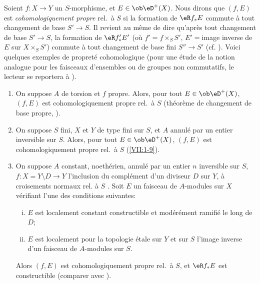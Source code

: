 Soient $f:X\to Y$ un $S$-morphisme, et $E\in\ob\eD^+(X)$. Nous dirons que 
$(f,E)$ est \emph{cohomologiquement propre} rel.\ à $S$ si la formation de 
$\eR f_\ast E$ commute à tout changement de base $S'\to S$. Il revient au 
même de dire qu'après tout changement de base $S'\to S$, la formation de 
$\eR f_\ast' E'$ (où $f'=f\times_S S'$, $E'=$image inverse de $E$ sur 
$X\times_S S'$) commute à tout changement de base fini $S'' \to S'$ (cf. 
). Voici quelques exemples de propreté cohomologique 
(pour une étude de la notion analogue pour les faisceaux d'ensembles ou de 
groupes non commutatifs, le lecteur se reportera à ). 
\begin{enumerate}[{1.3.}1.]
  \item On suppose $A$ de torsion et $f$ propre. Alors, pour tout 
    $E\in\ob\eD^+(X)$, $(f,E)$ est cohomologiquement propre rel.\ à $S$ 
    (théorème de changement de base propre, ). 
  \item On suppose $S$ fini, $X$ et $Y$ de type fini sur $S$, et $A$ annulé 
    par un entier inversible sur $S$. Alors, pour tout $E\in\ob\eD^+(X)$, 
    $(f,E)$ est cohomologiquement propre rel.\ à $S$ 
    (\ref{VII:1-9}). 
  \item On suppose $A$ constant, noethérien, annulé par un entier $n$ 
    inversible sur $S$, $f:X=Y\setminus D\to Y$ l'inclusion du complément 
    d'un diviseur $D$ sur $Y$, à croisements normaux rel. à $S$ 
    . Soit $E$ un faisceau de $A$-modules sur $X$ 
    vérifiant l'une des conditions suivantes: 
    \begin{enumerate}[(i)]
      \item $E$ est localement constant constructible et modérément 
        ramifié le long de $D$; 
      \item $E$ est localement pour la topologie étale sur $Y$ et sur $S$ 
        l'image inverse d'un faisceau de $A$-modules sur $S$. 
    \end{enumerate}
    Alors $(f,E)$ est cohomologiquement propre rel.\ à $S$, et $\eR f_\ast E$ est 
    constructible (comparer avec ). 
\end{enumerate} 

